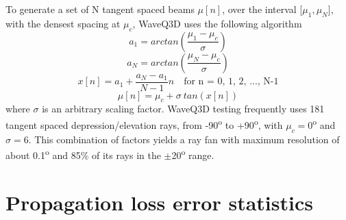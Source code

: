 \documentclass{ws-jca}
\begin{document}
To generate a set of N tangent spaced beams \(\mu[n]\), over the interval [\(\mu_1,\mu_N\)], with the densest spacing at \(\mu_c\), WaveQ3D uses the following algorithm
\begin{equation}
	a_1 = arctan \left( \frac{\mu_1-\mu_c}{\sigma} \right)
\end{equation}
\begin{equation}
	a_N = arctan \left( \frac{\mu_N-\mu_c}{\sigma} \right)
\end{equation}
\begin{equation}
	x[n] = a_1 +\frac{a_N-a_1}{N-1} n \quad \text{for n = 0, 1, 2, ..., N-1}
\end{equation}
\begin{equation}
	\mu[n] = \mu_c + \sigma \: tan(x[n])
\end{equation}
where
\(\sigma\) is an arbitrary scaling factor.  WaveQ3D testing frequently uses 181 tangent spaced depression/elevation rays, from -90\textsuperscript{o} to +90\textsuperscript{o}, with 
\(\mu_c=0\)\textsuperscript{o} and \(\sigma=6\).  This combination of factors yields a ray fan with maximum resolution of about 0.1\textsuperscript{o} and 85\% of its rays in the \(\pm\)20\textsuperscript{o} range.

\section{Propagation loss error statistics}
\end{document}
